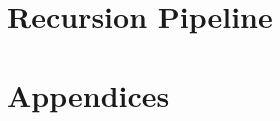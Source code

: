 \documentclass[11pt,a4paper]{report}
\renewcommand{\thesection}{\arabic{section}}
\begin{document}


\part{Recursion Pipeline}
\label{part:recursion}



\appendix
\renewcommand{\thesection}{\Alph{section}}
\part{Appendices}


\end{document}
